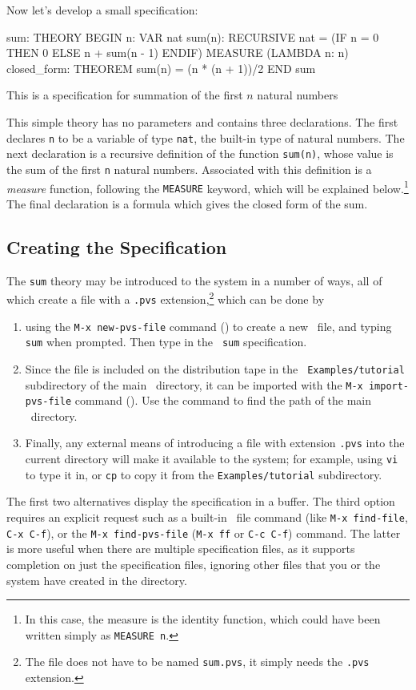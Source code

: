 Now let's develop a small specification:
\begin{pvsex}
sum: THEORY
 BEGIN
  n: VAR nat
  sum(n): RECURSIVE nat =
   (IF n = 0 THEN 0 ELSE n + sum(n - 1) ENDIF)
   MEASURE (LAMBDA n: n)
  closed_form: THEOREM sum(n) = (n * (n + 1))/2
 END sum
\end{pvsex}
%
This is a specification for summation of the first $n$ natural numbers

This simple theory has no parameters and contains three declarations.
The first declares {\tt n} to be a variable of type {\tt nat}, the
built-in type of natural numbers.  The next declaration is a recursive
definition of the function {\tt sum(n)}, whose value is the sum of the
first {\tt n} natural numbers.  Associated with this definition is a
{\em measure\/} function, following the {\tt MEASURE} keyword, which
will be explained below.\footnote{In this case, the measure is the
identity function, which could have been written simply as {\tt MEASURE
n}.} The final declaration is a formula which gives the closed form of
the sum.

\subsection{Creating the Specification}

The {\tt sum} theory may be introduced to the system in a number of
ways, all of which create a file with a {\tt .pvs}
extension,\footnote{The file does not have to be named {\tt sum.pvs}, it
simply needs the {\tt .pvs} extension.} which can be done by
\begin{enumerate}

\item using the {\tt M-x new-pvs-file} command () to create a new
\pvs\ file, and typing {\tt sum} when prompted.  Then type in the {\tt
sum} specification.

\item Since the file is included on the distribution tape in the {\tt
Examples/tutorial} subdirectory of the main \pvs\ directory, it can be
imported with the {\tt M-x import-pvs-file} command ().  Use
the  command to find the path of the main \pvs\
directory.

\item Finally, any external means of introducing a file with extension
{\tt .pvs} into the current directory will make it available to the
system; for example, using {\tt vi} to type it in, or {\tt cp} to copy
it from the {\tt Examples/tutorial} subdirectory.

\end{enumerate}
The first two alternatives display the specification in a buffer.
The third option requires an explicit request such as a built-in \gnu\
file command (like {\tt M-x find-file}, {\tt C-x C-f}), or the {\tt M-x
find-pvs-file} ({\tt M-x ff} or {\tt C-c C-f}) command.  The latter is
more useful when there are multiple specification files, as it supports
completion on just the specification files, ignoring other files that
you or the system have created in the directory.

